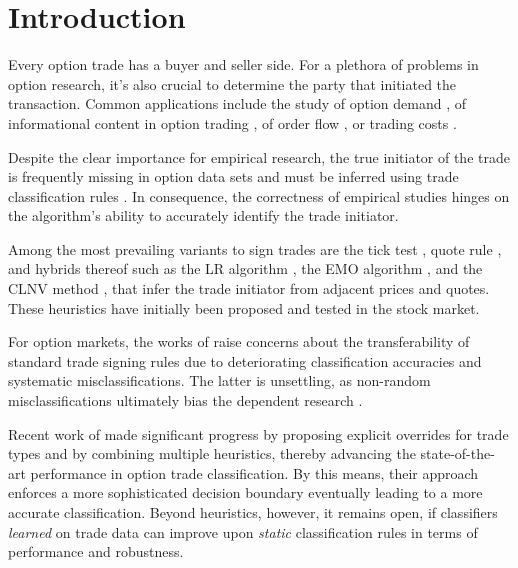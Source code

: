 \section{Introduction}\label{sec:introduction}

Every option trade has a buyer and seller side. For a plethora of problems in option research, it’s also crucial to determine the party that initiated the transaction. Common applications include the study of option demand \autocite[][3]{garleanuDemandBasedOptionPricing2009}, of informational content in option trading \autocites[][631]{huDoesOptionTrading2014}[][882]{panInformationOptionVolume2006}[][1079]{caoInformationalContentOption2005}, of order flow \autocite[][684]{muravyevOrderFlowExpected2016}, or trading costs \autocite[][4980]{muravyevOptionsTradingCosts2020}. 

Despite the clear importance for empirical research, the true initiator of the trade is frequently missing in option data sets and must be inferred using trade classification rules \autocite[][453]{easleyOptionVolumeStock1998}. In consequence, the correctness of empirical studies hinges on the algorithm's ability to accurately identify the trade initiator.

Among the most prevailing variants to sign trades are the tick test \autocite[][240]{hasbrouckTradesQuotesInventories1988}, quote rule \autocite[][41]{harrisDayEndTransactionPrice1989}, and hybrids thereof such as the \gls{LR} algorithm \autocite[][745]{leeInferringTradeDirection1991}, the \gls{EMO} algorithm \autocite[][536]{ellisAccuracyTradeClassification2000}, and the \gls{CLNV} method \autocite[][3809]{chakrabartyTradeClassificationAlgorithms2007}, that infer the trade initiator from adjacent prices and quotes. These heuristics have initially been proposed and tested in the stock market.

For option markets, the works of \textcites[][10--13]{grauerOptionTradeClassification2022}[][887]{savickasInferringDirectionOption2003} raise concerns about the transferability of standard trade signing rules due to deteriorating classification accuracies and systematic misclassifications. The latter is unsettling, as non-random misclassifications ultimately bias the dependent research \autocites[][260]{odders-whiteOccurrenceConsequencesInaccurate2000}[][157]{theissenTestAccuracyLee2001}.

Recent work of \textcite[][13--16]{grauerOptionTradeClassification2022} made significant progress by proposing explicit overrides for trade types and by combining multiple heuristics, thereby advancing the state-of-the-art performance in option trade classification. By this means, their approach enforces a more sophisticated decision boundary eventually leading to a more accurate classification. Beyond heuristics, however, it remains open, if classifiers \emph{learned} on trade data can improve upon \emph{static} classification rules in terms of performance and robustness.

